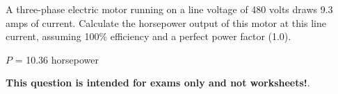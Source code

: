 

A three-phase electric motor running on a line voltage of 480 volts draws 9.3 amps of current.  Calculate the horsepower output of this motor at this line current, assuming 100\% efficiency and a perfect power factor (1.0).







$P$ = 10.36 horsepower







{\bf This question is intended for exams only and not worksheets!}.


